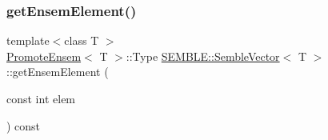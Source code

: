 \mbox{\label{structSEMBLE_1_1SembleVector_a51b3272526cbc8cf3e84182e659df0e3}} 
\subsubsection{\texorpdfstring{getEnsemElement()}{getEnsemElement()}\hspace{0.1cm}{\footnotesize\ttfamily [1/2]}}
{\footnotesize\ttfamily template$<$class T $>$ \\
\mbox{\hyperlink{structSEMBLE_1_1PromoteEnsem}{Promote\+Ensem}}$<$ T $>$\+::Type \mbox{\hyperlink{structSEMBLE_1_1SembleVector}{S\+E\+M\+B\+L\+E\+::\+Semble\+Vector}}$<$ T $>$\+::get\+Ensem\+Element (\begin{DoxyParamCaption}\item[{const int}]{elem }\end{DoxyParamCaption}) const}

